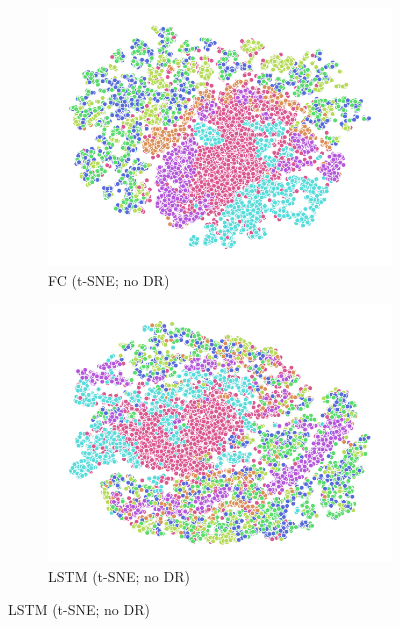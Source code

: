 \begin{figure}
\begin{subfigure}{0.22\textwidth}
    \includegraphics[width=\textwidth]{figures/chapter6/embeddings/jaco_no-DR_prop_fc1_tSNE.png}
    \caption{FC (t-SNE; no DR)}
  \end{subfigure}
  \begin{subfigure}{0.22\textwidth}
    \includegraphics[width=\textwidth]{figures/chapter6/embeddings/jaco_no-DR_prop_h_tSNE.png}
    \caption{LSTM (t-SNE; no DR)}
  \end{subfigure}


\end{figure}
